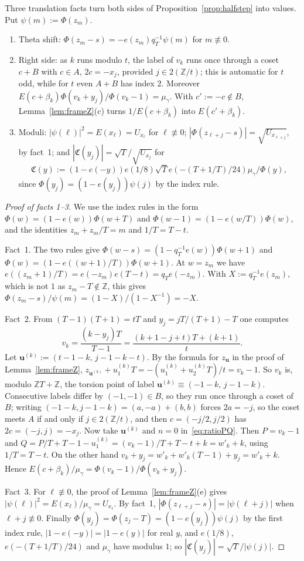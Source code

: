 \documentclass[11pt]{amsart}
\numberwithin{equation}{section}
\theoremstyle{plain}
\theoremstyle{definition}
\theoremstyle{remark}
\begin{document}
Three translation facts turn both sides of Proposition~\ref{prop:halfstep} into values. Put \(\psi(m):=\Phi(z_m)\).
\begin{enumerate}
\item[(1)] Theta shift: \(\Phi(z_m-s)=-e(z_m)q_T^{-1}\psi(m)\) for \(m\not\equiv0\).
\item[(2)] Right side: as \(k\) runs modulo \(t\), the label of \(v_k\) runs once through a coset \(c+B\) with \(c\in A\), \(2c=-x_j\), provided \(j\in2(\mathbb Z/t)\); this is automatic for \(t\) odd, while for \(t\) even \(A+B\) has index \(2\). Moreover \(E(c+\beta_k)\Phi(v_k+y_j)/\Phi(v_k-1)=\mu_\gamma\). With \(c':=-c\notin B\), Lemma~\ref{lem:frameZ}(c) turns \(1/E(c+\beta_k)\) into \(E(c'+\beta_k)\).
\item[(3)] Moduli: \(|\psi(\ell)|^2=E(x_\ell)=U_{x_\ell}\) for \(\ell\not\equiv0\); \(|\Phi(z_{\ell+j}-s)|=\sqrt{U_{x_{\ell+j}}}\), by fact~1; and \(|\mathfrak C(y_j)|=\sqrt T/\sqrt{U_{x_j}}\) for
\[\mathfrak C(y):=(1-e(-y))e(1/8)\sqrt Te(-(T+1/T)/24)\mu_\gamma/\Phi(y),\]
since \(\Phi(y_j)=(1-e(y_j))\psi(j)\) by the index rule.
\end{enumerate}

\begin{proof}[Proof of facts 1--3]
We use the index rules in the form \(\Phi(w)=(1-e(w))\Phi(w+T)\) and \(\Phi(w-1)=(1-e(w/T))\Phi(w)\), and the identities \(z_m+z_m/T=m\) and \(1/T=T-t\).

Fact~1. The two rules give \(\Phi(w-s)=(1-q_T^{-1}e(w))\Phi(w+1)\) and \(\Phi(w)=(1-e((w+1)/T))\Phi(w+1)\). At \(w=z_m\) we have \(e((z_m+1)/T)=e(-z_m)e(T-t)=q_Te(-z_m)\). With \(X:=q_T^{-1}e(z_m)\), which is not \(1\) as \(z_m-T\notin\mathbb Z\), this gives \(\Phi(z_m-s)/\psi(m)=(1-X)/(1-X^{-1})=-X\).

Fact~2. From \((T-1)(T+1)=tT\) and \(y_j=jT/(T+1)-T\) one computes
\[v_k=\frac{(k-y_j)T}{T-1}=\frac{(k+1-j+t)T+(k+1)}t .\]
Let \(\mathbf u^{(k)}:=(t-1-k,\,j-1-k-t)\). By the formula for \(z_{\mathbf u}\) in the proof of Lemma~\ref{lem:frameZ}, \(z_{\mathbf u^{(k)}}+u^{(k)}_1T=-(u^{(k)}_1+u^{(k)}_2T)/t=v_k-1\). So \(v_k\) is, modulo \(\mathbb ZT+\mathbb Z\), the torsion point of label \(\mathbf u^{(k)}\equiv(-1-k,\,j-1-k)\). Consecutive labels differ by \((-1,-1)\in B\), so they run once through a coset of \(B\); writing \((-1-k,j-1-k)=(a,-a)+(b,b)\) forces \(2a=-j\), so the coset meets \(A\) if and only if \(j\in2(\mathbb Z/t)\), and then \(c=(-j/2,j/2)\) has \(2c=(-j,j)=-x_j\). Now take \(\mathbf u^{(k)}\) and \(n=0\) in~\eqref{eq:ratioPQ}. Then \(P=v_k-1\) and \(Q=P/T+T-1-u^{(k)}_1=(v_k-1)/T+T-t+k=w'_k+k\), using \(1/T=T-t\). On the other hand \(v_k+y_j=w'_k+w'_k(T-1)+y_j=w'_k+k\). Hence \(E(c+\beta_k)/\mu_\gamma=\Phi(v_k-1)/\Phi(v_k+y_j)\).

Fact~3. For \(\ell\not\equiv0\), the proof of Lemma~\ref{lem:frameZ}(e) gives \(|\psi(\ell)|^2=E(x_\ell)/\mu_\gamma=U_{x_\ell}\). By fact~1, \(|\Phi(z_{\ell+j}-s)|=|\psi(\ell+j)|\) when \(\ell+j\not\equiv0\). Finally \(\Phi(y_j)=\Phi(z_j-T)=(1-e(y_j))\psi(j)\) by the first index rule, \(|1-e(-y)|=|1-e(y)|\) for real \(y\), and \(e(1/8)\), \(e(-(T+1/T)/24)\) and \(\mu_\gamma\) have modulus \(1\); so \(|\mathfrak C(y_j)|=\sqrt T/|\psi(j)|\).
\end{proof}
\end{document}
